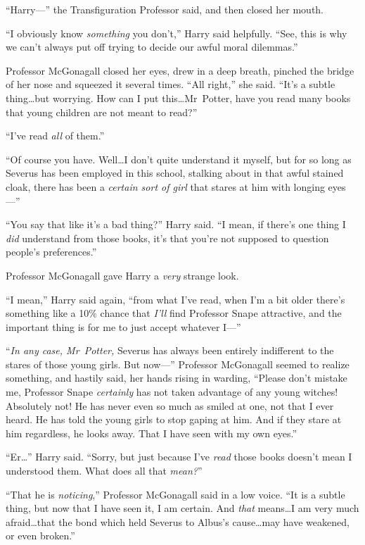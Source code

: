 “Harry—” the Transfiguration Professor said, and then closed her mouth.

“I obviously know \emph{something} you don’t,” Harry said helpfully. “See, this is why we can’t always put off trying to decide our awful moral dilemmas.”

Professor McGonagall closed her eyes, drew in a deep breath, pinched the bridge of her nose and squeezed it several times. “All right,” she said. “It’s a subtle thing…but worrying. How can I put this…Mr~Potter, have you read many books that young children are not meant to read?”

“I’ve read \emph{all} of them.”

“Of course you have. Well…I don’t quite understand it myself, but for so long as Severus has been employed in this school, stalking about in that awful stained cloak, there has been a \emph{certain sort of girl} that stares at him with longing eyes—”

“You say that like it’s a bad thing?” Harry said. “I mean, if there’s one thing I \emph{did} understand from those books, it’s that you’re not supposed to question people’s preferences.”

Professor McGonagall gave Harry a \emph{very} strange look.

“I mean,” Harry said again, “from what I’ve read, when I’m a bit older there’s something like a 10\% chance that \emph{I’ll} find Professor Snape attractive, and the important thing is for me to just accept whatever I—”

“\emph{In any case, Mr~Potter,} Severus has always been entirely indifferent to the stares of those young girls. But now—” Professor McGonagall seemed to realize something, and hastily said, her hands rising in warding, “Please don’t mistake me, Professor Snape \emph{certainly} has not taken advantage of any young witches! Absolutely not! He has never even so much as smiled at one, not that I ever heard. He has told the young girls to stop gaping at him. And if they stare at him regardless, he looks away. That I have seen with my own eyes.”

“Er…” Harry said. “Sorry, but just because I’ve \emph{read} those books doesn’t mean I understood them. What does all that \emph{mean?}”

“That he is \emph{noticing},” Professor McGonagall said in a low voice. “It is a subtle thing, but now that I have seen it, I am certain. And \emph{that} means…I am very much afraid…that the bond which held Severus to Albus’s cause…may have weakened, or even broken.”


